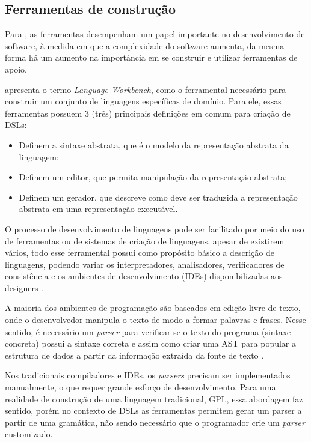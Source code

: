 \newpage
\subsection{Ferramentas de construção}
\label{ferramentasdsl}

Para , as ferramentas desempenham um papel importante no desenvolvimento de software, à medida em que a complexidade do software aumenta, da mesma forma há um aumento na importância em se construir e utilizar ferramentas de apoio.

 apresenta o termo \textit{Language Workbench}, como o ferramental necessário para construir um conjunto de linguagens específicas de domínio. Para ele, essas ferramentas possuem 3 (três) principais definições em comum para criação de \gls{DSL}s:

\begin{itemize}
    \item Definem a sintaxe abstrata, que é o modelo da representação abstrata da linguagem;
    \item Definem um editor, que permita manipulação da representação abstrata;
    \item Definem um gerador, que descreve como deve ser traduzida a representação abstrata em uma representação executável.
\end{itemize}

O processo de desenvolvimento de linguagens pode ser facilitado por meio do uso de ferramentas ou de sistemas de criação de linguagens, apesar de existirem vários, todo esse ferramental possui como propósito básico a descrição de linguagens, podendo variar os interpretadores, analisadores, verificadores de consistência e os ambientes de desenvolvimento (\gls{IDE}s) disponibilizadas aos designers \cite{mernik2005and}. 

\begin{citacao}


A maioria dos ambientes de programação são baseados em edição livre de texto, onde o desenvolvedor manipula o texto de modo a formar palavras e frases. Nesse sentido, é necessário um \textit{parser} para verificar se o texto do programa (sintaxe concreta) possui a sintaxe correta e assim como criar uma \gls{AST} para popular a estrutura de dados a partir da informação extraída da fonte de texto  \cite{dslengineering}.

\end{citacao}


Nos tradicionais compiladores e \gls{IDE}s, os \textit{parsers} precisam ser implementados manualmente, o que requer grande esforço de desenvolvimento. Para uma realidade de construção de uma linguagem tradicional, \gls{GPL}, essa abordagem faz sentido, porém no contexto de \gls{DSL}s as ferramentas permitem gerar um parser a partir de uma gramática, não sendo necessário que o programador crie um \textit{parser} customizado.

